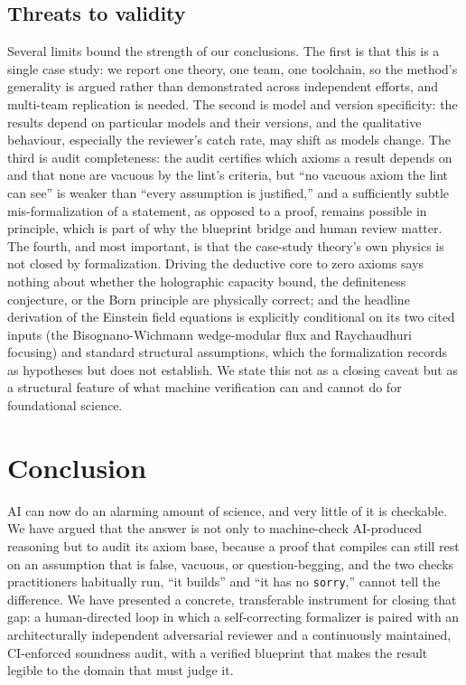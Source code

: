 \documentclass[11pt]{article}
\begin{document}
\subsection{Threats to validity}

Several limits bound the strength of our conclusions. The first is that this is a single case study:
we report one theory, one team, one toolchain, so the method's generality is argued rather than
demonstrated across independent efforts, and multi-team replication is needed. The second is model and
version specificity: the results depend on particular models and their versions, and the qualitative
behaviour, especially the reviewer's catch rate, may shift as models change. The third is audit
completeness: the audit certifies which axioms a result depends on and that none are vacuous by the
lint's criteria, but ``no vacuous axiom the lint can see'' is weaker than ``every assumption is
justified,'' and a sufficiently subtle mis-formalization of a statement, as opposed to a proof, remains
possible in principle, which is part of why the blueprint bridge and human review matter. The fourth,
and most important, is that the case-study theory's own physics is not closed by formalization. Driving
the deductive core to zero axioms says nothing about whether the holographic capacity bound, the
definiteness conjecture, or the Born principle are physically correct; and the headline derivation of
the Einstein field equations is explicitly conditional on its two cited inputs (the Bisognano-Wichmann
wedge-modular flux and Raychaudhuri focusing) and standard structural assumptions, which the
formalization records as hypotheses but does not establish. We state this not as a closing caveat but
as a structural feature of what machine verification can and cannot do for foundational science.

\section{Conclusion}

AI can now do an alarming amount of science, and very little of it is checkable. We have argued that
the answer is not only to machine-check AI-produced reasoning but to audit its axiom base, because a
proof that compiles can still rest on an assumption that is false, vacuous, or question-begging, and
the two checks practitioners habitually run, ``it builds'' and ``it has no \texttt{sorry},'' cannot
tell the difference. We have presented a concrete, transferable instrument for closing that gap: a
human-directed loop in which a self-correcting formalizer is paired with an architecturally
independent adversarial reviewer and a continuously maintained, CI-enforced soundness audit, with a
verified blueprint that makes the result legible to the domain that must judge it.
\end{document}
